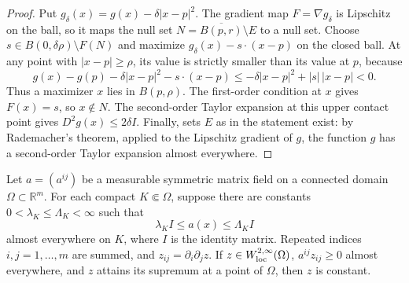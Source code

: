 \begin{proof}
Put $g_\delta(x)=g(x)-\delta|x-p|^2$.  The gradient map
$F=\nabla g_\delta$ is Lipschitz on the ball, so it maps the null set
$N=\overline{B(p,r)}\setminus E$ to a null set.  Choose
$s\in B(0,\delta\rho)\setminus F(N)$ and maximize
$g_\delta(x)-s\cdot(x-p)$ on the closed ball.  At any point with
$|x-p|\geq\rho$, its value is strictly smaller than its value at $p$,
because
\[
 g(x)-g(p)-\delta|x-p|^2-s\cdot(x-p)
 \leq-\delta|x-p|^2+|s|\,|x-p|<0.
\]
Thus a maximizer $x$ lies in $B(p,\rho)$.  The first-order condition at $x$ gives
$F(x)=s$, so $x\notin N$.  The second-order Taylor expansion at this
upper contact point gives $D^2g(x)\leq2\delta I$.
Finally, sets $E$ as in the statement exist: by Rademacher's theorem, applied to the
Lipschitz gradient of $g$, the function $g$ has a second-order Taylor expansion
almost everywhere.
\end{proof}

\begin{lemma}\label{uni-lem:measSMP}
Let $a=(a^{ij})$ be a measurable symmetric matrix field on a connected
domain $\Omega\subset\mathbb R^m$. For each compact $K\Subset\Omega$, suppose there are constants $0<\lambda_K\leq\Lambda_K<\infty$ such that
\[
   \lambda_K I\leq a(x)\leq\Lambda_KI
\]
almost everywhere on $K$, where $I$ is the identity matrix. Repeated indices $i,j=1,\ldots,m$ are summed, and $z_{ij}=\partial_i\partial_jz$. If
$z\in W^{2,\infty}_{\rm loc}(\Omega)$,
$a^{ij}z_{ij}\geq0$ almost everywhere, and $z$ attains its supremum at a
point of $\Omega$, then $z$ is constant.
\end{lemma}

